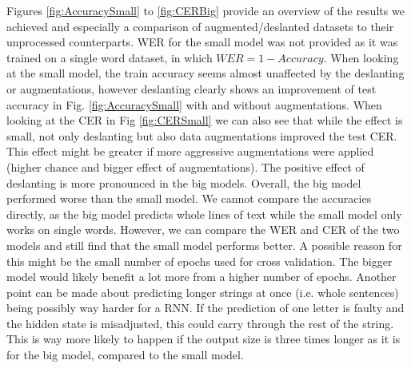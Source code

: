 \documentclass{article}
\begin{document}
Figures \ref{fig:AccuracySmall} to \ref{fig:CERBig} provide an overview of the results we achieved and especially a comparison of augmented/deslanted datasets to their unprocessed counterparts. WER for the small model was not provided as it was trained on a single word dataset, in which $WER = 1 - Accuracy$. When looking at the small model, the train accuracy seems almost unaffected by the deslanting or augmentations, however deslanting clearly shows an improvement of test accuracy in Fig. \ref{fig:AccuracySmall} with and without augmentations. When looking at the CER in Fig \ref{fig:CERSmall} we can also see that while the effect is small, not only deslanting but also data augmentations improved the test CER. This effect might be greater if more aggressive augmentations were applied (higher chance and bigger effect of augmentations). The positive effect of deslanting is more pronounced in the big models. Overall, the big model performed worse than the small model. We cannot compare the accuracies directly, as the big model predicts whole lines of text while the small model only works on single words. However, we can compare the WER and CER of the two models and still find that the small model performs better. A possible reason for this might be the small number of epochs used for cross validation. The bigger model would likely benefit a lot more from a higher number of epochs. Another point can be made about predicting longer strings at once (i.e. whole sentences) being possibly way harder for a RNN. If the prediction of one letter is faulty and the hidden state is misadjusted, this could carry through the rest of the string. This is way more likely to happen if the output size is three times longer as it is for the big model, compared to the small model. 
\end{document}
